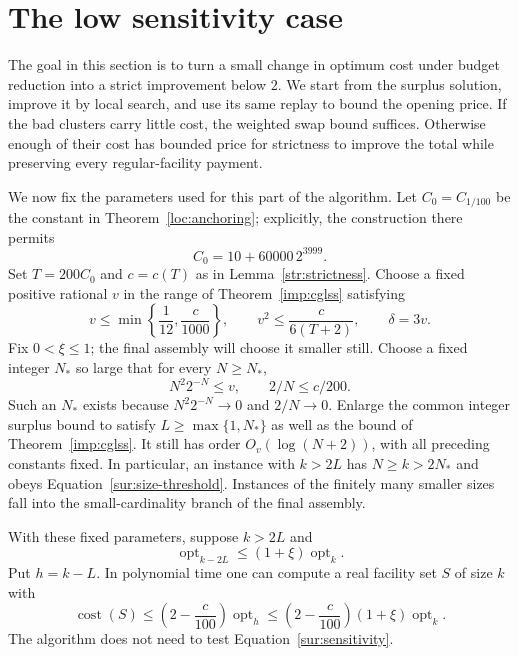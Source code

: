 \section{The low sensitivity case}
\label{sur:section}

The goal in this section is to turn a small change in optimum cost
under budget reduction into a strict improvement below $2$.  We start
from the surplus solution, improve it by local search, and use its
same replay to bound the opening price.  If the bad clusters carry
little cost, the weighted swap bound suffices.  Otherwise enough of
their cost has bounded price for strictness to improve the total while
preserving every regular-facility payment.

We now fix the parameters used for this part of the algorithm.  Let
$C_0=C_{1/100}$ be the constant in Theorem~\ref{loc:anchoring}; explicitly,
the construction there permits
\[
 C_0=10+60000\,2^{3999}.
\]
Set $T=200C_0$ and $c=c(T)$ as in Lemma~\ref{str:strictness}.
Choose a fixed positive rational $v$ in the range of
Theorem~\ref{imp:cglss} satisfying
\begin{equation}\label{sur:parameter-choices}
 v\le\min\left\{\frac1{12},\frac{c}{1000}\right\},
 \qquad v^2\le\frac{c}{6(T+2)},
 \qquad \delta=3v.
\end{equation}
Fix $0<\xi\le1$; the final assembly will choose it smaller still.
Choose a fixed integer $N_*$ so large that for every $N\ge N_*$,
\begin{equation}\label{sur:size-threshold}
 N^2 2^{-N}\le v,\qquad 2/N\le c/200.
\end{equation}
Such an $N_*$ exists because $N^2 2^{-N}\to0$ and $2/N\to0$.
Enlarge the common integer surplus bound to satisfy
$L\ge\max\{1,N_*\}$ as well as the bound of
Theorem~\ref{imp:cglss}.  It still has order
$O_v(\log(N+2))$, with all preceding constants fixed.  In particular,
an instance with $k>2L$ has $N\ge k>2N_*$ and obeys
Equation~\eqref{sur:size-threshold}.  Instances of the finitely many
smaller sizes fall into the small-cardinality branch of the final
assembly.

\begin{proposition}\label{sur:low-sensitivity}
With these fixed parameters, suppose $k>2L$ and
\begin{equation}\label{sur:sensitivity}
 \operatorname{opt}_{k-2L}\le(1+\xi)\operatorname{opt}_k.
\end{equation}
Put $h=k-L$.  In polynomial time one can compute a real facility set
$S$ of size $k$ with
\begin{equation}\label{sur:conclusion}
 \operatorname{cost}(S)
 \le\left(2-\frac{c}{100}\right)\operatorname{opt}_h
 \le\left(2-\frac{c}{100}\right)(1+\xi)
       \operatorname{opt}_k.
\end{equation}
The algorithm does not need to test Equation~\eqref{sur:sensitivity}.
\end{proposition}

